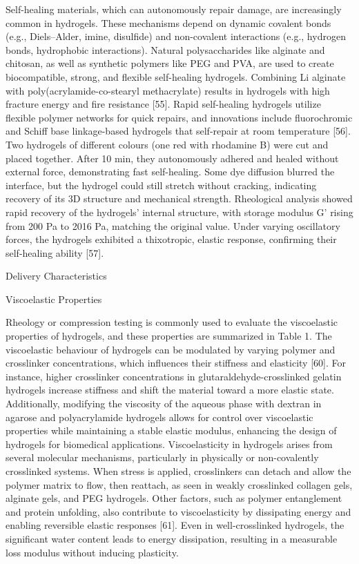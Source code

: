 \documentclass[../../main-notes.tex]{subfiles}
\begin{document}
Self-healing materials, which can autonomously repair damage, are increasingly common in hydrogels. 
These mechanisms depend on dynamic covalent bonds (e.g., Diels–Alder, imine, disulfide) and non-covalent interactions (e.g., hydrogen bonds, hydrophobic interactions). 
Natural polysaccharides like alginate and chitosan, as well as synthetic polymers like PEG and PVA, are used to create biocompatible, strong, and flexible self-healing hydrogels. 
Combining Li alginate with poly(acrylamide-co-stearyl methacrylate) results in hydrogels with high fracture energy and fire resistance [55]. 
Rapid self-healing hydrogels utilize flexible polymer networks for quick repairs, and innovations include fluorochromic and Schiff base linkage-based hydrogels that self-repair at room temperature [56]. 
Two hydrogels of different colours (one red with rhodamine B) were cut and placed together. 
After 10 min, they autonomously adhered and healed without external force, demonstrating fast self-healing. 
Some dye diffusion blurred the interface, but the hydrogel could still stretch without cracking, indicating recovery of its 3D structure and mechanical strength. 
Rheological analysis showed rapid recovery of the hydrogels’ internal structure, with storage modulus G’ rising from 200 Pa to 2016 Pa, matching the original value. Under varying oscillatory forces, the hydrogels exhibited a thixotropic, elastic response, confirming their self-healing ability [57].




Delivery Characteristics 

Viscoelastic Properties

Rheology or compression testing is commonly used to evaluate the viscoelastic properties of hydrogels, and these properties are summarized in Table 1. 
The viscoelastic behaviour of hydrogels can be modulated by varying polymer and crosslinker concentrations, which influences their stiffness and elasticity [60]. 
For instance, higher crosslinker concentrations in glutaraldehyde-crosslinked gelatin hydrogels increase stiffness and shift the material toward a more elastic state. 
Additionally, modifying the viscosity of the aqueous phase with dextran in agarose and polyacrylamide hydrogels allows for control over viscoelastic properties while maintaining a stable elastic modulus, enhancing the design of hydrogels for biomedical applications. 
Viscoelasticity in hydrogels arises from several molecular mechanisms, particularly in physically or non-covalently crosslinked systems.
When stress is applied, crosslinkers can detach and allow the polymer matrix to flow, then reattach, as seen in weakly crosslinked collagen gels, alginate gels, and PEG hydrogels. 
Other factors, such as polymer entanglement and protein unfolding, also contribute to viscoelasticity by dissipating energy and enabling reversible elastic responses [61]. 
Even in well-crosslinked hydrogels, the significant water content leads to energy dissipation, resulting in a measurable loss modulus without inducing plasticity.
\end{document}
